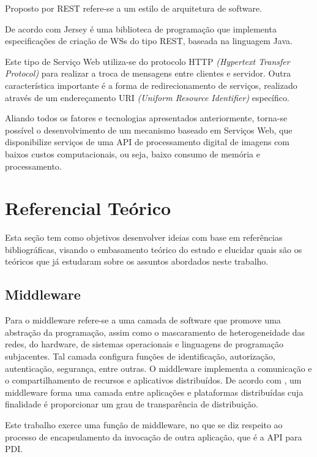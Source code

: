 \documentclass[12pt]{article}
\begin{document}
Proposto por \cite{rest} REST refere-se a um estilo de arquitetura de software.

De acordo com \cite{jersey} Jersey é uma biblioteca de programação que implementa especificações de criação de WSs do tipo REST, baseada na linguagem Java.

Este tipo de Serviço Web utiliza-se do protocolo HTTP \textit{(Hypertext Transfer Protocol)} para realizar a troca
de mensagens entre clientes e servidor. Outra característica importante é a forma de
redirecionamento de serviços, realizado através de um endereçamento URI \textit{(Uniform Resource Identifier)}
específico.

Aliando todos os fatores e tecnologias apresentados anteriormente, torna-se
possível o desenvolvimento de um mecanismo baseado em Serviços Web, que disponibilize serviços de uma API de processamento digital de imagens
com baixos custos computacionais, ou seja, baixo consumo de memória e processamento.

\section{Referencial Teórico} \label{sec:firstpage}

Esta seção tem como objetivos desenvolver ideias com base em referências bibliográficas, visando o embasamento teórico do estudo e elucidar quais são os teóricos que já estudaram sobre os assuntos abordados neste trabalho.

\subsection{Middleware}

Para \cite{coulouris:05} o middleware refere-se a uma camada de software
que promove uma abstração da programação, assim como o mascaramento de
heterogeneidade das redes, do hardware, de sistemas operacionais e linguagens de
programação subjacentes. Tal camada configura funções de identificação, autorização,
autenticação, segurança, entre outras. O middleware implementa a comunicação e o
compartilhamento de recursos e aplicativos distribuídos.
De acordo com \cite{tanenbaum:07}, um middleware forma uma camada entre aplicações e plataformas distribuídas
cuja finalidade é proporcionar um grau de transparência de distribuição. 

Este trabalho exerce uma função de middleware, no que se diz respeito ao processo de encapsulamento da invocação de outra aplicação, que é a API para PDI.
\end{document}
